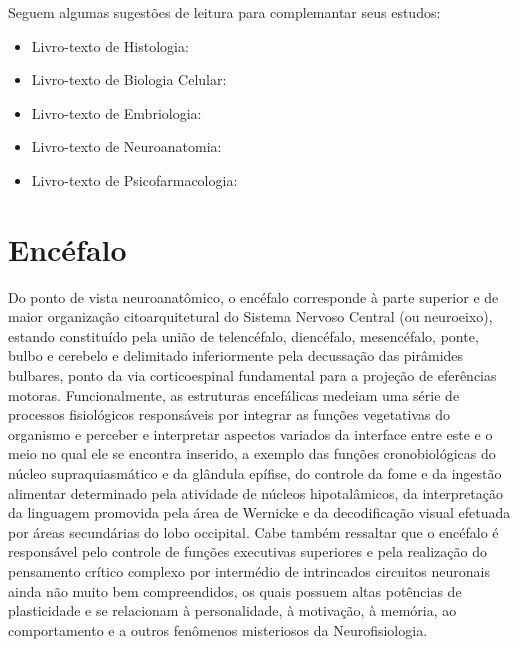 \documentclass[
]{book}
\providecommand{\tightlist}{%
  \setlength{\itemsep}{0pt}\setlength{\parskip}{0pt}}
\begin{document}
Seguem algumas sugestões de leitura para complemantar seus estudos:

\begin{itemize}
\tightlist
\item
  Livro-texto de Histologia: \citep{junqueira2018histologia}
\item
  Livro-texto de Biologia Celular: \citep{kierszenbaum2008histologia}
\item
  Livro-texto de Embriologia: \citep{schoenwolf2014larsen}
\item
  Livro-texto de Neuroanatomia: \citep{machado2013neuroanatomia}
\item
  Livro-texto de Psicofarmacologia: \citep{stahl2021stahl}
\end{itemize}

\hypertarget{encuxe9falo}{%
\chapter{Encéfalo}\label{encuxe9falo}}

Do ponto de vista neuroanatômico, o encéfalo corresponde à parte superior e de maior organização citoarquitetural do Sistema Nervoso Central (ou neuroeixo), estando constituído pela união de telencéfalo, diencéfalo, mesencéfalo, ponte, bulbo e cerebelo e delimitado inferiormente pela decussação das pirâmides bulbares, ponto da via corticoespinal fundamental para a projeção de eferências motoras. Funcionalmente, as estruturas encefálicas medeiam uma série de processos fisiológicos responsáveis por integrar as funções vegetativas do organismo e perceber e interpretar aspectos variados da interface entre este e o meio no qual ele se encontra inserido, a exemplo das funções cronobiológicas do núcleo supraquiasmático e da glândula epífise, do controle da fome e da ingestão alimentar determinado pela atividade de núcleos hipotalâmicos, da interpretação da linguagem promovida pela área de Wernicke e da decodificação visual efetuada por áreas secundárias do lobo occipital. Cabe também ressaltar que o encéfalo é responsável pelo controle de funções executivas superiores e pela realização do pensamento crítico complexo por intermédio de intrincados circuitos neuronais ainda não muito bem compreendidos, os quais possuem altas potências de plasticidade e se relacionam à personalidade, à motivação, à memória, ao comportamento e a outros fenômenos misteriosos da Neurofisiologia.
\end{document}

